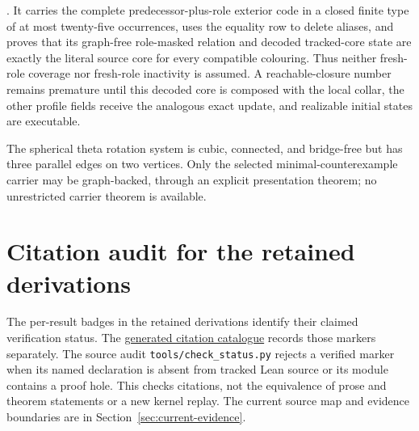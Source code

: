 \documentclass[11pt]{article}
\theoremstyle{definition}
\begin{document}
\begin{description}
        .
        It carries the complete predecessor-plus-role exterior code in a closed
        finite type of at most twenty-five occurrences, uses the equality row
        to delete aliases, and proves that its graph-free role-masked relation
        and decoded tracked-core state are exactly the literal source core for
        every compatible colouring.  Thus neither fresh-role coverage nor
        fresh-role inactivity is assumed.  A reachable-closure number remains
        premature until this decoded core is composed with the local collar,
        the other profile fields receive the analogous exact update, and
        realizable initial states are executable.
  \item[Global simple-graph backing of a rotation carrier.] The spherical
        theta rotation system is cubic, connected, and bridge-free but has
        three parallel edges on two vertices.  Only the selected
        minimal-counterexample carrier may be graph-backed, through an
        explicit presentation theorem; no unrestricted carrier theorem is
        available.
\end{description}

\section{Citation audit for the retained derivations}
\label{sec:generated-status-ledger}
The per-result badges in the retained derivations identify their claimed
verification status. The
\href{foundations/status-ledger.tex}{generated citation catalogue}
records those markers separately. The source audit
\texttt{tools/check\_status.py} rejects a verified marker when its named
declaration is absent from tracked Lean source or its module contains a
proof hole. This checks citations, not the equivalence of prose and theorem
statements or a new kernel replay. The current source map and evidence
boundaries are in Section~\ref{sec:current-evidence}.
\end{document}
